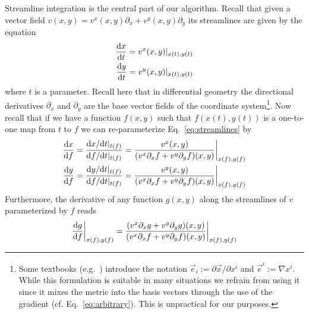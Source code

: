 Streamline integration is the central part of our algorithm. Recall that
given a vector field $v(x,y)=v^x(x,y)\partial_x + v^y(x,y)\partial_y$ its streamlines are given by the equation
\begin{subequations}
\begin{align}
  \frac{\mathrm{d} x}{\mathrm{d} t } = v^x(x,y)|_{x(t), y(t)} \\
  \frac{\mathrm{d} y}{\mathrm{d} t } = v^y(x,y)|_{x(t), y(t)}
\end{align}
\label{eq:streamlines}
\end{subequations}
where $t$ is a parameter. Recall here that in differential geometry 
the directional derivatives $\partial_x$ and
$\partial_y$ are the base vector fields of the coordinate system\footnote{ 
  Some textbooks (e.g.~\cite{haeseleer}) introduce the notation $\vec e_i := \partial \vec x /\partial x^i$ 
  and $\vec e^i := \nabla x^i$. 
  While this formulation is suitable in many situations we refrain from 
  using it since it mixes the metric into the basis vectors through the use of 
  the gradient (cf. Eq.~\eqref{eq:arbitrary}). 
  This is unpractical for our purposes.}.
Now recall that if we have a function $f(x,y)$ 
such that $f(x(t), y(t))$ is a one-to-one map from $t$ to $f$ we can re-parameterize
Eq.~\eqref{eq:streamlines} by
\begin{subequations}
\begin{align}
  \frac{\mathrm{d} x}{\mathrm{d} f } = \frac{\mathrm{d} x/\mathrm{d} t|_{t(f)}}{\mathrm{d} f/\mathrm{d} t|_{t(f)}} = 
  \frac{v^x(x,y) }{ (v^x\partial_xf + v^y\partial_yf)(x,y) }\bigg |_{x(f), y(f)}\\
  \frac{\mathrm{d} y}{\mathrm{d} f } = \frac{\mathrm{d} y/\mathrm{d} t|_{t(f)}}{\mathrm{d} f/\mathrm{d} t|_{t(f)}} = 
  \frac{v^y(x,y) }{ (v^x\partial_xf + v^y\partial_yf)(x,y) }\bigg |_{x(f), y(f)}
\end{align}
\label{eq:reparameter}
\end{subequations}
Furthermore, the derivative of any function $g(x,y)$ along the streamlines of $v$ 
parameterized by $f$ reads
\begin{align}
  \frac{\mathrm{d} g}{\mathrm{d} f }\bigg |_{x(f),y(f)} = 
  \frac{(v^x\partial_x g + v^y\partial_y g)(x,y) }{ (v^x\partial_xf + v^y\partial_yf)(x,y) }\bigg |_{x(f),y(f)}
  \label{}
\end{align}


